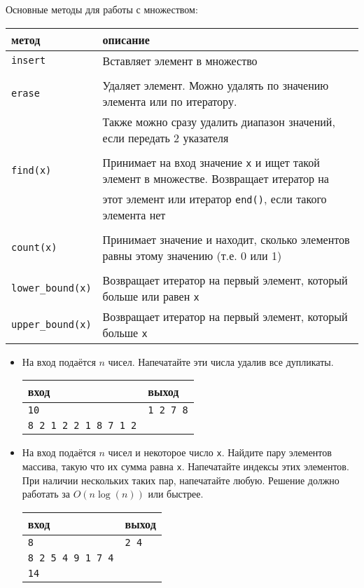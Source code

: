 \documentclass{article}
\begin{document}
Основные методы для работы с множеством:
\begin{center}
\begin{tabular}{ l | l }
 метод & описание \\ \hline
 \texttt{insert}  & Вставляет элемент в множество\\ \\\hline
 \texttt{erase}   & Удаляет элемент. Можно удалять по значению элемента или по итератору.  \\ 
                  & Также можно сразу удалить диапазон значений, если передать 2 указателя \\\\ \hline
 \texttt{find(x)} & Принимает на вход значение \texttt{x} и ищет такой элемент в множестве. Возвращает итератор на \\
                  &  этот элемент или итератор \texttt{end()}, если такого элемента нет\\ \\ \hline
 \texttt{count(x)}  & Принимает значение и находит, сколько элементов равны этому значению (т.е. 0 или 1) \\ \\\hline
 \texttt{lower\_bound(x)}  & Возвращает итератор на первый элемент, который больше или равен \texttt{x} \\
 \texttt{upper\_bound(x)}  & Возвращает итератор на первый элемент, который больше \texttt{x} \\
\end{tabular}
\end{center}



\begin{itemize}

\item На вход подаётся $n$ чисел. Напечатайте эти числа удалив все дупликаты.
\begin{center}
\begin{tabular}{ l | l }
 вход & выход \\ \hline
 \texttt{10} & \texttt{1 2 7 8}  \\ 
 \texttt{8 2 1 2 2 1 8 7 1 2} &  \\
\end{tabular}
\end{center}


\item На вход подаётся $n$ чисел и некоторое число \texttt{x}. Найдите пару элементов массива, такую что их сумма равна \texttt{x}. Напечатайте индексы этих элементов. При наличии нескольких таких пар, напечатайте любую. Решение должно работать за $O(n \log(n))$ или быстрее.
\begin{center}
\begin{tabular}{ l | l }
 вход & выход \\ \hline
 \texttt{8} & \texttt{2 4}  \\ 
 \texttt{8 2 5 4 9 1 7 4} &  \\
 \texttt{14} &  \\
\end{tabular}
\end{center}
\end{itemize}
\end{document}
